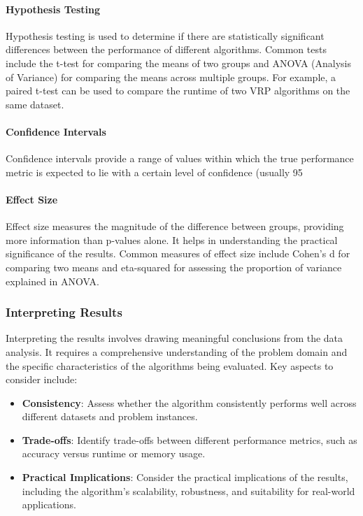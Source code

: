\documentclass[
]{article}
\begin{document}
\paragraph{Hypothesis Testing}

Hypothesis testing is used to determine if there are statistically significant differences between the performance of different algorithms. Common tests include the t-test for comparing the means of two groups and ANOVA (Analysis of Variance) for comparing the means across multiple groups. For example, a paired t-test can be used to compare the runtime of two VRP algorithms on the same dataset.

\paragraph{Confidence Intervals}

Confidence intervals provide a range of values within which the true performance metric is expected to lie with a certain level of confidence (usually 95%

\paragraph{Effect Size}

Effect size measures the magnitude of the difference between groups, providing more information than p-values alone. It helps in understanding the practical significance of the results. Common measures of effect size include Cohen's d for comparing two means and eta-squared for assessing the proportion of variance explained in ANOVA.

\subsubsection{Interpreting Results}

Interpreting the results involves drawing meaningful conclusions from the data analysis. It requires a comprehensive understanding of the problem domain and the specific characteristics of the algorithms being evaluated. Key aspects to consider include:

\begin{itemize}
    \item \textbf{Consistency}: Assess whether the algorithm consistently performs well across different datasets and problem instances.
    \item \textbf{Trade-offs}: Identify trade-offs between different performance metrics, such as accuracy versus runtime or memory usage.
    \item \textbf{Practical Implications}: Consider the practical implications of the results, including the algorithm's scalability, robustness, and suitability for real-world applications.
\end{itemize}
\end{document}
